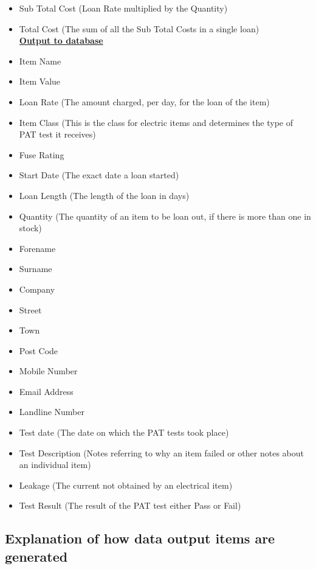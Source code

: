 \begin{itemize}
    \item Sub Total Cost (Loan Rate multiplied by the Quantity)
    \item Total Cost (The sum of all the Sub Total Costs in a single loan)\\
    \newline
    \textbf{\underline{Output to database}}
    \item Item Name
    \item Item Value
    \item Loan Rate (The amount charged, per day, for the loan of the item)
    \item Item Class (This is the class for electric items and determines the type of PAT test it receives)
    \item Fuse Rating\\ \hline
    \item Start Date (The exact date a loan started)
    \item Loan Length (The length of the loan in days)
    \item Quantity (The quantity of an item to be loan out, if there is more than one in stock)\\ \hline
    \item Forename
    \item Surname
    \item Company
    \item Street
    \item Town
    \item Post Code
    \item Mobile Number
    \item Email Address
    \item Landline Number\\ \hline
    \item Test date (The date on which the PAT tests took place)
    \item Test Description (Notes referring to why an item failed or other notes about an individual item)
    \item Leakage (The current not obtained by an electrical item)
    \item Test Result (The result of the PAT test either Pass or Fail)
\end{itemize}


\subsection{Explanation of how data output items are generated}

